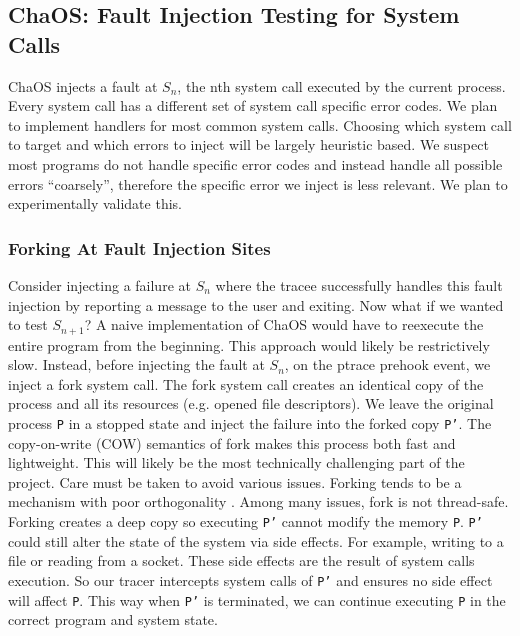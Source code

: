 \subsection{ChaOS: Fault Injection Testing for System Calls}     
ChaOS injects a fault at $S_n$, the nth system call executed by the current process. Every system call has a different set of system call specific error codes. We plan to implement handlers for most common system calls. Choosing which system call to target and which errors to inject will be largely heuristic based. We suspect most programs do not handle specific error codes and instead handle all possible errors ``coarsely'', therefore the specific error we inject is less relevant. We plan to experimentally validate this.

\subsubsection{Forking At Fault Injection Sites}
Consider injecting a failure at $S_n$ where the tracee successfully handles this fault injection by reporting a message to the user and exiting. Now what if we wanted to test $S_{n+1}$? A naive implementation of ChaOS would have to reexecute the entire program from the beginning. This approach would likely be restrictively slow.
Instead, before injecting the fault at $S_n$, on the ptrace prehook event, we inject a fork system call. The fork system call creates an identical copy of the process and all its resources (e.g. opened file descriptors). We leave the original process \texttt{P} in a stopped state and inject the failure into the forked copy \texttt{P'}. The copy-on-write (COW) semantics of fork makes this process both fast and lightweight. This will likely be the most technically challenging part of the project. Care must be taken to avoid various issues. Forking tends to be a mechanism with poor orthogonality \cite{aforkintheroad}. Among many issues, fork is not thread-safe. Forking creates a deep copy so executing \texttt{P'} cannot modify the memory \texttt{P}. \texttt{P'} could still alter the state of the system via side effects. For example, writing to a file or reading from a socket. These side effects are the result of system calls execution. So our tracer intercepts system calls of \texttt{P'} and ensures no side effect will affect \texttt{P}. This way when \texttt{P'} is terminated, we can continue executing \texttt{P} in the correct program and system state.

